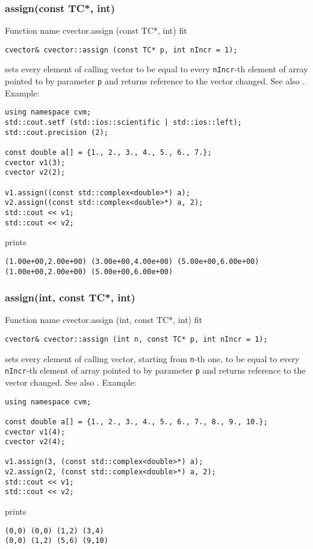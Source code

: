 \subsubsection{assign(const TC*, int)}
Function%
\pdfdest name {cvector.assign (const TC*, int)} fit
\begin{verbatim}
cvector& cvector::assign (const TC* p, int nIncr = 1);
\end{verbatim}
sets every element of  calling vector to be equal to
every \verb"nIncr"-th element of  array pointed to by parameter \verb"p"
and returns  reference to the vector changed.
See also .
Example:
\begin{Verbatim}
using namespace cvm;
std::cout.setf (std::ios::scientific | std::ios::left);
std::cout.precision (2);

const double a[] = {1., 2., 3., 4., 5., 6., 7.};
cvector v1(3);
cvector v2(2);

v1.assign((const std::complex<double>*) a);
v2.assign((const std::complex<double>*) a, 2);
std::cout << v1;
std::cout << v2;
\end{Verbatim}
prints
\begin{Verbatim}
(1.00e+00,2.00e+00) (3.00e+00,4.00e+00) (5.00e+00,6.00e+00)
(1.00e+00,2.00e+00) (5.00e+00,6.00e+00)
\end{Verbatim}
\newpage




\subsubsection{assign(int, const TC*, int)}
Function%
\pdfdest name {cvector.assign (int, const TC*, int)} fit
\begin{verbatim}
cvector& cvector::assign (int n, const TC* p, int nIncr = 1);
\end{verbatim}
sets every element of  calling vector, starting from \Based \verb"n"-th one,
to be equal to
every \verb"nIncr"-th element of  array pointed to by parameter \verb"p"
and returns  reference to the vector changed.
See also .
Example:
\begin{Verbatim}
using namespace cvm;

const double a[] = {1., 2., 3., 4., 5., 6., 7., 8., 9., 10.};
cvector v1(4);
cvector v2(4);

v1.assign(3, (const std::complex<double>*) a);
v2.assign(2, (const std::complex<double>*) a, 2);
std::cout << v1;
std::cout << v2;
\end{Verbatim}
prints
\begin{Verbatim}
(0,0) (0,0) (1,2) (3,4)
(0,0) (1,2) (5,6) (9,10)
\end{Verbatim}
\newpage




